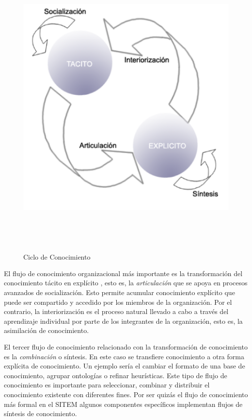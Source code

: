 \begin{figure}
 \centering
 \includegraphics[width=156mm, height=156mm]{Ciclo_Conocimiento.png}
 \caption{Ciclo de Conocimiento}
 \label{ciclo_conocimiento}
\end{figure}

El flujo de conocimiento organizacional más importante es la transformación del conocimiento tácito en explícito \cite{wiig1993}, esto es, la \textit{articulación} que se apoya en procesos avanzados de socialización. Esto permite acumular conocimiento explícito que puede ser compartido y accedido por los miembros de la organización. Por el contrario, la interiorización es el proceso natural llevado a cabo a través del aprendizaje individual por parte de los integrantes de la organización, esto es, la asimilación de conocimiento. 

El tercer flujo de conocimiento relacionado con la transformación de conocimiento es la \textit{combinación} o síntesis. En este caso se transfiere conocimiento a otra forma explícita de conocimiento. Un ejemplo sería el cambiar el formato de una base de conocimiento, agrupar ontologías o refinar heurísticas. Este tipo de flujo de conocimiento es importante para seleccionar, combinar y distribuir el conocimiento existente con diferentes fines. Por ser quizás el flujo de conocimiento más formal en el SITEM algunos componentes específicos implementan flujos de síntesis de conocimiento.

